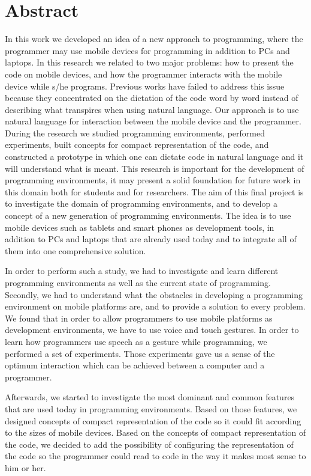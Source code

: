 \section*{Abstract}
In this work we developed an idea of a new approach to programming, where the programmer may use mobile devices for programming in addition to PCs and laptops. In this research we related to two major problems: how to present the code on mobile devices, and how the programmer interacts with the mobile device while s/he programs. Previous works have failed to address this issue because they concentrated on the dictation of the code word by word instead of describing what transpires when using natural language. Our approach is to use natural language for interaction between the mobile device and the programmer. During the research we studied programming environments, performed experiments, built concepts for compact representation of the code, and constructed a prototype in which one can dictate code in natural language and it will understand what is meant. This research is important for the development of programming environments, it may present a solid foundation for future work in this domain both for students and for researchers.
The aim of this final project is to investigate the domain of programming environments, and to develop a concept of a new generation of programming environments. The idea is to use mobile devices such as tablets and smart phones as development tools, in addition to PCs and laptops that are already used today and to integrate all of them into one comprehensive solution.

In order to perform such a study, we had to investigate and learn different programming environments as well as the current state of programming. Secondly, we had to understand what the obstacles in developing a programming environment on mobile platforms are, and to provide a solution to every problem. We found that in order to allow programmers to use mobile platforms as development environments, we have to use voice and touch gestures. In order to learn how programmers use speech as a gesture while programming, we performed a set of experiments. Those experiments gave us a sense of the optimum interaction which can be achieved between a computer and a programmer.

Afterwards, we started to investigate the most dominant and common features that are used today in programming environments. Based on those features, we designed concepts of compact representation of the code so it could fit according to the sizes of mobile devices. Based on the concepts of compact representation of the code, we decided to add the possibility of configuring the representation of the code so the programmer could read to code in the way it makes most sense to him or her.

